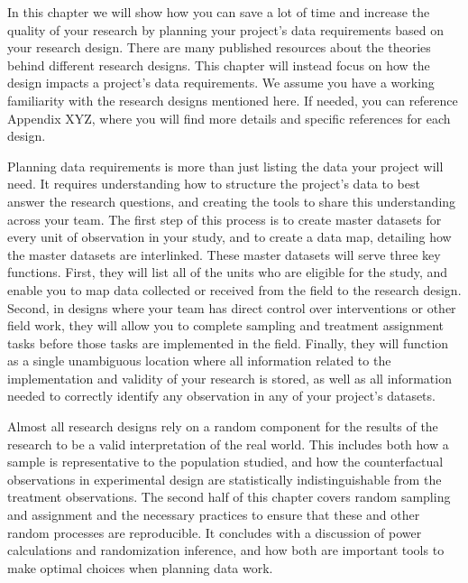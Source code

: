 
\begin{fullwidth}

In this chapter we will show how you can save a lot of time
and increase the quality of your research by planning your project's data requirements
based on your research design.
There are many published resources about 
the theories behind different research designs.
This chapter will instead focus on how the design 
impacts a project's data requirements.
We assume you have a working familiarity
with the research designs mentioned here.
If needed, you can reference Appendix XYZ,
where you will find more details 
and specific references for each design.

Planning data requirements is more than just listing the data your project will need. 
It requires understanding how to structure the project's data to best answer the research questions, 
and creating the tools to share this understanding across your team.
The first step of this process is to create master datasets 
for every unit of observation in your study,
and to create a data map, 
detailing how the master datasets are interlinked.
These master datasets will serve three key functions.
First, they will list all of the units who are eligible for the study,
and enable you to map data collected or received from the field to the research design.
Second, in designs where your team has direct control over interventions or other field work,
they will allow you to complete sampling and treatment assignment tasks
before those tasks are implemented in the field.
Finally, they will function as a single unambiguous location where all information 
related to the implementation and validity of your research is stored,
as well as all information needed to correctly identify any observation in any of your project's datasets.

Almost all research designs rely on a random component 
for the results of the research to be a valid interpretation of the real world.
This includes both how a sample is representative to the population studied,
and how the counterfactual observations in experimental design are statistically indistinguishable
from the treatment observations.
The second half of this chapter covers random sampling and assignment
and the necessary practices to ensure that 
these and other random processes are reproducible.
It concludes with a discussion of power calculations and randomization inference,
and how both are important tools to make optimal choices when planning data work.


\end{fullwidth}

